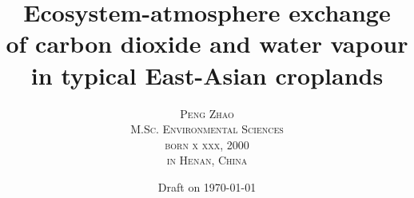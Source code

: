 \documentclass[headsepline, twoside, openright]{scrreprt}
\numberwithin{equation}{chapter}
\begin{document}

\titlehead{}
\title{\LARGE Ecosystem-atmosphere exchange\\of carbon dioxide and water vapour\\in typical East-Asian croplands }
\subject{\normalfont A dissertation submitted to the
         \vspace{.5cm} \\
         \scshape Bayreuth Graduate School of Mathematical and Natural Sciences (BAYNAT)\\
                  University of Bayreuth
         \vspace{1.0cm}\\
         \normalfont to attain the academic degree of\\
        \scshape Doctor of Natural Science (Dr. rer. nat.)}
\author{\scshape Peng Zhao\\
        M.Sc. Environmental Sciences
        \vspace{.5cm} \\
        born x xxx, 2000\\
        in Henan, China}
\date{\vspace{.5cm} Draft on \today}
\publishers{supervised by \scshape Dr. Johannes L\"{u}ers}

\maketitle
\onehalfspacing
{}
\tableofcontents
\listofsymbols
\newpage



\end{document}
